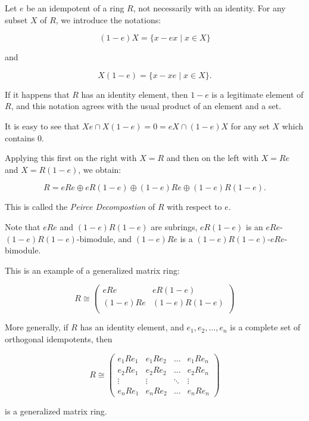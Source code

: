 \documentclass[12pt]{article}
\newcommand{\isom}{\cong}
\begin{document}
Let $e$ be an idempotent of a ring $R$, not necessarily with an identity.
For any subset $X$ of $R$, we introduce the notations:

$$(1-e)X = \{ x - ex \mid x \in X\}$$

and

$$X(1-e) = \{x - xe \mid x \in X\}.$$

If it happens that $R$ has an identity element, then $1-e$ is a legitimate element of
$R$, and this notation agrees with the usual product of an element and a set.

It is easy to see that $Xe \cap X(1-e) = 0 = eX \cap (1-e)X$ for any set $X$ which contains $0$.

Applying this first on the right with $X = R$ and then on the left with $X = Re$ and $X = R(1-e)$,
we obtain:

$$R = eRe \oplus eR(1-e) \oplus (1-e)Re \oplus (1-e)R(1-e).$$

This is called the {\em Peirce Decompostion} of $R$ with respect to $e$.

Note that $eRe$ and $(1-e)R(1-e)$ are subrings, $eR(1-e)$ is an $eRe$-$(1-e)R(1-e)$-bimodule,
and $(1-e)Re$ is a $(1-e)R(1-e)$-$eRe$-bimodule.

This is an example of a generalized matrix ring:

$$R \isom
  \begin{pmatrix}
    eRe & eR(1-e) \\
    (1-e)Re & (1-e)R(1-e) \\
  \end{pmatrix}
$$

More generally, if $R$ has an identity element,
and $e_1, e_2, \dots, e_n$ is a complete set of orthogonal idempotents,
then

$$R \isom
  \begin{pmatrix}
    e_1Re_1 & e_1Re_2 & \dots & e_1Re_n \\
    e_2Re_1 & e_2Re_2 & \dots & e_2Re_n \\
    \vdots & \vdots & \ddots & \vdots \\
    e_nRe_1 & e_nRe_2 & \dots & e_nRe_n
  \end{pmatrix}
$$

is a generalized matrix ring.
\end{document}
